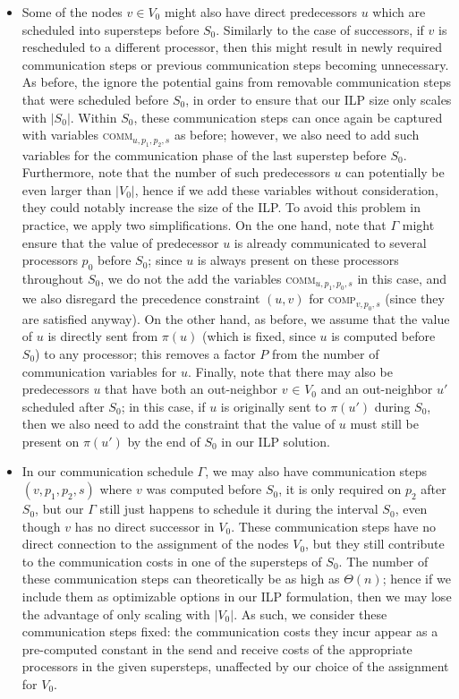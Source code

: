 \documentclass[sigconf,nonacm]{acmart}
\begin{document}
\begin{itemize}[topsep=4pt,itemsep=0pt,partopsep=2pt,parsep=7pt]
    \item  Some of the nodes $v \in V_0$ might also have direct predecessors $u$ which are scheduled into supersteps before $S_0$. Similarly to the case of successors, if $v$ is rescheduled to a different processor, then this might result in newly required communication steps or previous communication steps becoming unnecessary. As before, the ignore the potential gains from removable communication steps that were scheduled before $S_0$, in order to ensure that our ILP size only scales with $|S_0|$. Within $S_0$, these communication steps can once again be captured with variables \textsc{comm}$_{u,p_1,p_2,s}$ as before; however, we also need to add such variables for the communication phase of the last superstep before $S_0$. Furthermore, note that the number of such predecessors $u$ can potentially be even larger than $|V_0|$, hence if we add these variables without consideration, they could notably increase the size of the ILP. To avoid this problem in practice, we apply two simplifications. On the one hand, note that $\Gamma$ might ensure that the value of predecessor $u$ is already communicated to several processors $p_0$ before $S_0$; since $u$ is always present on these processors throughout $S_0$, we do not the add the variables \textsc{comm}$_{u,p_1,p_0,s}$ in this case, and we also disregard the precedence constraint $(u,v)$ for \textsc{comp}$_{v, p_0, s}$ (since they are satisfied anyway). On the other hand, as before, we assume that the value of $u$ is directly sent from $\pi(u)$ (which is fixed, since $u$ is computed before $S_0$) to any processor; this removes a factor $P$ from the number of communication variables for $u$. Finally, note that there may also be predecessors $u$ that have both an out-neighbor $v _{\!} \in _{\!} V_0$ and an out-neighbor $u'$ scheduled after $S_0$; in this case, if $u$ is originally sent to $\pi(u')$ during $S_0$, then we also need to add the constraint that the value of $u$ must still be present on $\pi(u')$ by the end of $S_0$ in our ILP solution.
    \item In our communication schedule $\Gamma$, we may also have communication steps $(v, p_1, p_2, s)$ where $v$ was computed before $S_0$, it is only required on $p_2$ after $S_0$, but our $\Gamma$ still just happens to schedule it during the interval $S_0$, even though $v$ has no direct successor in $V_0$. These communication steps have no direct connection to the assignment of the nodes $V_0$, but they still contribute to the communication costs in one of the supersteps of $S_0$. The number of these communication steps can theoretically be as high as $\Theta(n)$; hence if we include them as optimizable options in our ILP formulation, then we may lose the advantage of only scaling with $|V_0|$. As such, we consider these communication steps fixed: the communication costs they incur appear as a pre-computed constant in the send and receive costs of the appropriate processors in the given supersteps, unaffected by our choice of the assignment for $V_0$.
\end{itemize}
\end{document}
